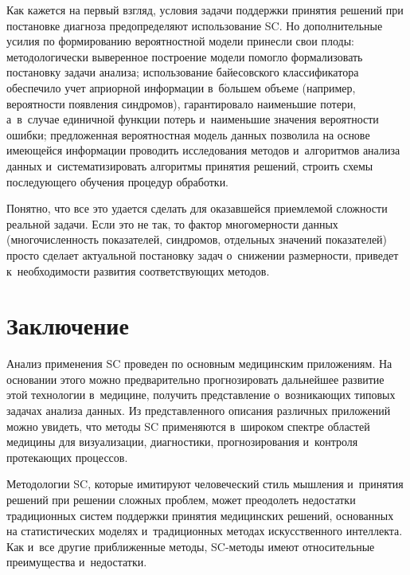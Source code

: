 \begin{multicols}{2}
     
     Как кажется на первый взгляд, условия задачи поддержки принятия 
решений при постановке диагноза предопределяют использование SC. Но 
дополнительные усилия по формированию вероятностной модели принесли 
свои плоды: методологически выверенное построение модели помогло 
формализовать постановку задачи анализа; использование байесовского 
классификатора обеспечило учет априорной информации 
в~б$\acute{\mbox{о}}$льшем объеме (например, вероятности появления 
синдромов), гарантировало наименьшие потери, а~в~случае единичной 
функции потерь и~наименьшие значения вероятности ошибки; предложенная 
вероятностная модель данных позволила на основе имеющейся информации 
проводить исследования методов и~алгоритмов анализа данных 
и~систематизировать алгоритмы принятия решений, строить схемы 
последующего обучения процедур обработки.
     
     Понятно, что все это удается сделать для оказавшейся приемлемой 
сложности реальной задачи. Если это не так, то фактор многомерности данных 
(многочисленность показателей, синдромов, отдельных значений показателей) 
просто сделает актуальной постановку задач 
о~снижении размерности, приведет к~необходимости развития соответствующих методов.

\vspace*{-8pt}

\section{Заключение}

\vspace*{-2pt}

     Анализ применения SC проведен по основным медицинским 
приложениям. На основании этого можно предварительно прогнозировать 
дальнейшее развитие этой технологии в~медицине, получить представление 
о~возникающих типовых задачах анализа данных. Из представленного 
описания различных приложений можно увидеть, что методы SC применяются 
в~широком спектре областей медицины для визуализации, диагностики, 
прогнозирования и~контроля протекающих процессов.
     
     Методологии SC, которые имитируют человеческий стиль мышления 
     и~принятия решений при решении сложных проблем, может преодолеть 
недостатки традиционных систем поддержки принятия медицинских решений, 
основанных на статистических моделях и~традиционных методах 
искусственного интеллекта. Как и~все другие приближенные методы,  
SC-ме\-то\-ды имеют относительные преимущества и~недостатки.
     

\end{multicols}
